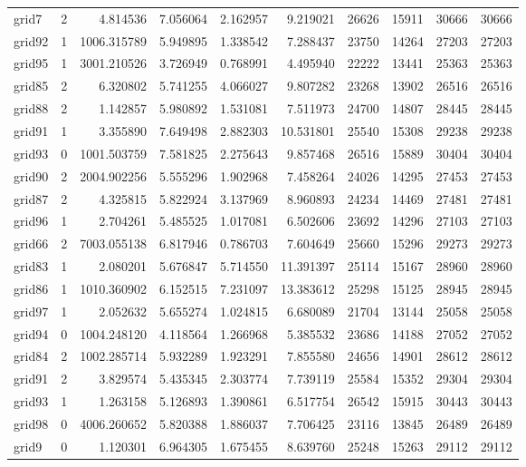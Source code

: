 \begin{longtable}{|l|r|r|r|r|r|r|r|r|r|}
grid7 & 2 & 4.814536 & 7.056064 & 2.162957 & 9.219021 & 26626 & 15911 & 30666 & 30666 \\
grid92 & 1 & 1006.315789 & 5.949895 & 1.338542 & 7.288437 & 23750 & 14264 & 27203 & 27203 \\
grid95 & 1 & 3001.210526 & 3.726949 & 0.768991 & 4.495940 & 22222 & 13441 & 25363 & 25363 \\
grid85 & 2 & 6.320802 & 5.741255 & 4.066027 & 9.807282 & 23268 & 13902 & 26516 & 26516 \\
grid88 & 2 & 1.142857 & 5.980892 & 1.531081 & 7.511973 & 24700 & 14807 & 28445 & 28445 \\
grid91 & 1 & 3.355890 & 7.649498 & 2.882303 & 10.531801 & 25540 & 15308 & 29238 & 29238 \\
grid93 & 0 & 1001.503759 & 7.581825 & 2.275643 & 9.857468 & 26516 & 15889 & 30404 & 30404 \\
grid90 & 2 & 2004.902256 & 5.555296 & 1.902968 & 7.458264 & 24026 & 14295 & 27453 & 27453 \\
grid87 & 2 & 4.325815 & 5.822924 & 3.137969 & 8.960893 & 24234 & 14469 & 27481 & 27481 \\
grid96 & 1 & 2.704261 & 5.485525 & 1.017081 & 6.502606 & 23692 & 14296 & 27103 & 27103 \\
grid66 & 2 & 7003.055138 & 6.817946 & 0.786703 & 7.604649 & 25660 & 15296 & 29273 & 29273 \\
grid83 & 1 & 2.080201 & 5.676847 & 5.714550 & 11.391397 & 25114 & 15167 & 28960 & 28960 \\
grid86 & 1 & 1010.360902 & 6.152515 & 7.231097 & 13.383612 & 25298 & 15125 & 28945 & 28945 \\
grid97 & 1 & 2.052632 & 5.655274 & 1.024815 & 6.680089 & 21704 & 13144 & 25058 & 25058 \\
grid94 & 0 & 1004.248120 & 4.118564 & 1.266968 & 5.385532 & 23686 & 14188 & 27052 & 27052 \\
grid84 & 2 & 1002.285714 & 5.932289 & 1.923291 & 7.855580 & 24656 & 14901 & 28612 & 28612 \\
grid91 & 2 & 3.829574 & 5.435345 & 2.303774 & 7.739119 & 25584 & 15352 & 29304 & 29304 \\
grid93 & 1 & 1.263158 & 5.126893 & 1.390861 & 6.517754 & 26542 & 15915 & 30443 & 30443 \\
grid98 & 0 & 4006.260652 & 5.820388 & 1.886037 & 7.706425 & 23116 & 13845 & 26489 & 26489 \\
grid9 & 0 & 1.120301 & 6.964305 & 1.675455 & 8.639760 & 25248 & 15263 & 29112 & 29112 \\

\end{longtable}
